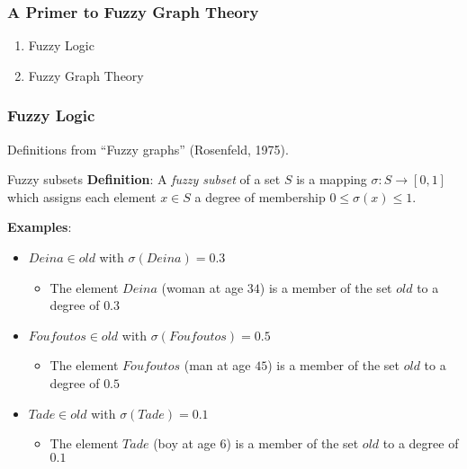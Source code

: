 



\begin{frame}
	\frametitle{A Primer to Fuzzy Graph Theory}

	\begin{enumerate}
		\item Fuzzy Logic
		\item Fuzzy Graph Theory
	\end{enumerate}
\end{frame}

\begin{frame}
	\frametitle{Fuzzy Logic}

	Definitions from ``Fuzzy graphs'' {\footnotesize (Rosenfeld, 1975)}.

	\begin{block}{Fuzzy subsets}
		\textbf{Definition}: A \textit{fuzzy subset} of a set $S$ is a mapping $\sigma: S \rightarrow [0, 1]$ which assigns each element $x \in S$ a degree of membership $0 \le \sigma(x) \le 1$.

		\vspace*{2em}

		\textbf{Examples}:
		\begin{itemize}
			\item $Deina \in old$ with $\sigma(Deina) = 0.3$
			\begin{itemize}
				\item The element $Deina$ (woman at age $34$) is a member of the set $old$ to a degree of $0.3$
			\end{itemize}
			\item $Foufoutos \in old$ with $\sigma(Foufoutos) = 0.5$
			\begin{itemize}
				\item The element $Foufoutos$ (man at age $45$) is a member of the set $old$ to a degree of $0.5$
			\end{itemize}
			\item $Tade \in old$ with $\sigma(Tade) = 0.1$
			\begin{itemize}
				\item The element $Tade$ (boy at age $6$) is a member of the set $old$ to a degree of $0.1$
			\end{itemize}
		\end{itemize}
	\end{block}
\end{frame}


